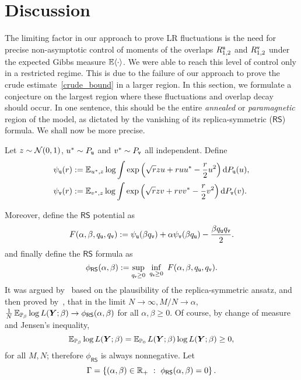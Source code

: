 \documentclass[final,12pt]{colt2018} %
\newcommand{\RS}{\mathsf{RS}} %
\newcommand{\utt}{\textup{\texttt{u}}}
\newcommand{\vtt}{\textup{\texttt{v}}}
\newcommand{\Y}{\bm{Y}}
\begin{document}
\section{Discussion}
\label{sxn:discussion}
The limiting factor in our approach to prove LR fluctuations is the need for precise non-asymptotic control of moments of the overlaps $R_{1,2}^{\utt}$ and $R_{1,2}^{\vtt}$ under the expected Gibbs measure $\operatorname{\mathbb{E}} \langle \cdot \rangle$. We were able to reach this level of control only in a restricted regime. This is  due to the failure of our approach to prove the crude estimate~\eqref{crude_bound} in a larger region. In this section, we formulate a conjecture on the largest region where these fluctuations and overlap decay should occur. In one sentence, this should be the entire \emph{annealed} or \emph{paramagnetic} region of the model, as dictated by the vanishing of its replica-symmetric ($\RS$) formula. We shall now be more precise.        

Let $z \sim \mathcal{N}(0,1)$, $u^* \sim P_\utt$ and $v^* \sim P_\vtt$ all independent. Define 
\begin{align*}
\psi_{\utt}(r) &:= \E_{u^*,z} \log \int \exp\left(\sqrt{r}zu + r uu^* - \frac{r}{2} u^2\right) \rmd P_\utt(u),\\
\psi_{\vtt}(r) &:= \E_{v^*,z} \log \int \exp\left(\sqrt{r}zv + r vv^* - \frac{r}{2} v^2\right) \rmd P_\vtt(v).
\end{align*}

Moreover, define the $\RS$ potential as
\[F(\alpha,\beta, q_{\utt}, q_{\vtt}) := \psi_{\utt}(\beta q_{\vtt}) + \alpha \psi_{\vtt}(\beta  q_{\utt}) -\frac{\beta  q_{\utt} q_{\vtt}}{2}.\]
and finally define the $\RS$ formula as
\[\phi_{\RS}(\alpha,\beta) := \sup_{q_{\vtt} \ge 0}~ \inf_{q_{\utt}\ge 0}~ F(\alpha,\beta, q_{\utt}, q_{\vtt}).\]
It was argued by~\cite{lesieur2015mmse} based on the plausibility of the replica-symmetric ansatz, and then proved by~\cite{miolane2017fundamental}, that in the limit $N \to \infty, M/N \to \alpha$, $\frac{1}{N}\E_{\P_{\beta}}\log L(\Y;\beta) \rightarrow \phi_{\RS}(\alpha,\beta)$ for all $\alpha,\beta \ge 0$. \citep[See also][for results in a more general setup.]{barbier2017phase} Of course, by change of measure and Jensen's inequality, 
\[\E_{\P_{\beta}} \log  L(\Y;\beta) = \E_{\P_{0}} L(\Y;\beta)\log  L(\Y;\beta) \ge 0,\]
for all $M,N$; therefore $\phi_{\RS}$ is always nonnegative. Let 
\[\Gamma = \left\{(\alpha,\beta) \in \Rp ~:~ \phi_{\RS}(\alpha,\beta) = 0\right\}.\]
\end{document}
